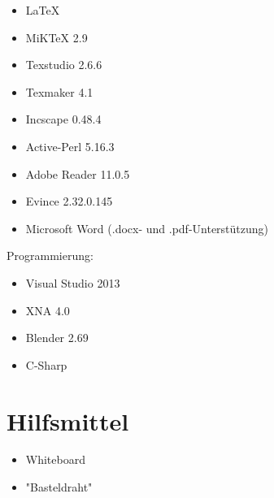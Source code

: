 \begin{itemize}

\item LaTeX

\item MiKTeX 2.9
\item Texstudio 2.6.6
\item Texmaker 4.1
\item Incscape 0.48.4 
\item Active-Perl 5.16.3
\item Adobe Reader 11.0.5
\item Evince 2.32.0.145

\item Microsoft Word (.docx- und .pdf-Unterstützung)

\end{itemize}

Programmierung:

\begin{itemize}

\item Visual Studio 2013
\item XNA 4.0
\item Blender 2.69

\item C-Sharp

\end{itemize}


\section{Hilfsmittel}

\begin{itemize}

\item Whiteboard
\item "Basteldraht" 

\end{itemize}



%
%
%
%
%
%
%
%
%
%
%
%
